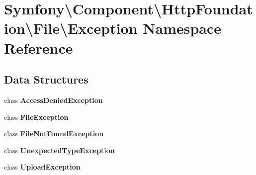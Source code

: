 \section{Symfony\textbackslash{}Component\textbackslash{}Http\+Foundation\textbackslash{}File\textbackslash{}Exception Namespace Reference}
\label{namespace_symfony_1_1_component_1_1_http_foundation_1_1_file_1_1_exception}
\subsection*{Data Structures}
\begin{DoxyCompactItemize}
\item 
class {\bf Access\+Denied\+Exception}
\item 
class {\bf File\+Exception}
\item 
class {\bf File\+Not\+Found\+Exception}
\item 
class {\bf Unexpected\+Type\+Exception}
\item 
class {\bf Upload\+Exception}
\end{DoxyCompactItemize}
